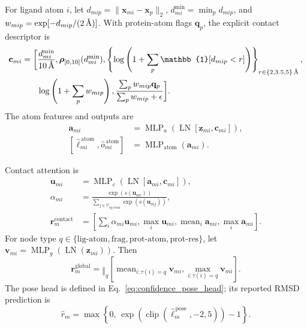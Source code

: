 For ligand atom \(i\), let
\(d_{mip}=\|\mathbf{x}_{mi}-\mathbf{x}_p\|_2\),
\(d^{\min}_{mi}=\min_p d_{mip}\), and
\(w_{mip}=\exp[-d_{mip}/(2\,\text{\normalfont\AA})]\). With protein-atom flags
\(\mathbf{q}_p\), the explicit contact descriptor is
\begin{align}
    \mathbf{c}_{mi}
    =\bigg[
      &\frac{d^{\min}_{mi}}{10\,\angstrom},
      \boldsymbol{\rho}_{[0,10]}(d^{\min}_{mi}),
      \left\{
      \log\left(1+\sum_p\mathbb{1}[d_{mip}<r]\right)
      \right\}_{r\in\{2,3.5,5\}\,\angstrom},\nonumber\\
      &\log\left(1+\sum_p w_{mip}\right),
      \frac{\sum_p w_{mip}\mathbf{q}_p}
           {\sum_p w_{mip}+\epsilon}
    \bigg].
    \label{eq:confidence_contact_features}
\end{align}
The atom features and outputs are
\begin{align}
    \mathbf{a}_{mi}
    &=
    \operatorname{MLP}_{a}
    \left(
      \operatorname{LN}[
      \mathbf{z}_{mi},\mathbf{c}_{mi}]
    \right),\\
    [\widehat{\ell}^{\,\mathrm{atom}}_{mi},
      \widehat{o}^{\,\mathrm{atom}}_{mi}]
    &=
    \operatorname{MLP}_{\mathrm{atom}}(\mathbf{a}_{mi}).
    \label{eq:confidence_atom_head}
\end{align}

Contact attention is
\begin{align}
    \mathbf{u}_{mi}
    &=
    \operatorname{MLP}_{c}
    \left(
      \operatorname{LN}[
      \mathbf{a}_{mi},\mathbf{c}_{mi}]
    \right),\\
    \alpha_{mi}
    &=
    \frac{
      \exp(s(\mathbf{u}_{mi}))
    }{
      \sum_{j\in\mathcal{V}_{\mathrm{lig\text{-}atom}}}
      \exp(s(\mathbf{u}_{mj}))
    },\\
    \mathbf{r}^{\mathrm{contact}}_m
    &=
    \left[
      \sum_i\alpha_{mi}\mathbf{u}_{mi},
      \max_i\mathbf{u}_{mi},
      \operatorname{mean}_i\mathbf{a}_{mi},
      \max_i\mathbf{a}_{mi}
    \right].
    \label{eq:contact_attention}
\end{align}
For node type
\(q\in\{\mathrm{lig\text{-}atom},\mathrm{frag},
\mathrm{prot\text{-}atom},\mathrm{prot\text{-}res}\}\), let
\(\mathbf{v}_{mi}=\operatorname{MLP}_g(\operatorname{LN}(\mathbf{z}_{mi}))\).
Then
\begin{equation}
    \mathbf{r}^{\mathrm{global}}_m
    =
    \mathop{\Vert}_{q}
    \left[
      \operatorname{mean}_{i:\tau(i)=q}\mathbf{v}_{mi},
      \max_{i:\tau(i)=q}\mathbf{v}_{mi}
    \right].
    \label{eq:global_type_pooling}
\end{equation}
The pose head is defined in Eq.~\eqref{eq:confidence_pose_head}; its reported
RMSD prediction is
\begin{equation}
    \widehat{r}_m
    =
    \max
    \left\{
      0,\,
      \exp\left(
        \operatorname{clip}
        (\widehat{\ell}^{\,\mathrm{pose}}_m,-2,5)
      \right)-1
    \right\}.
\end{equation}

